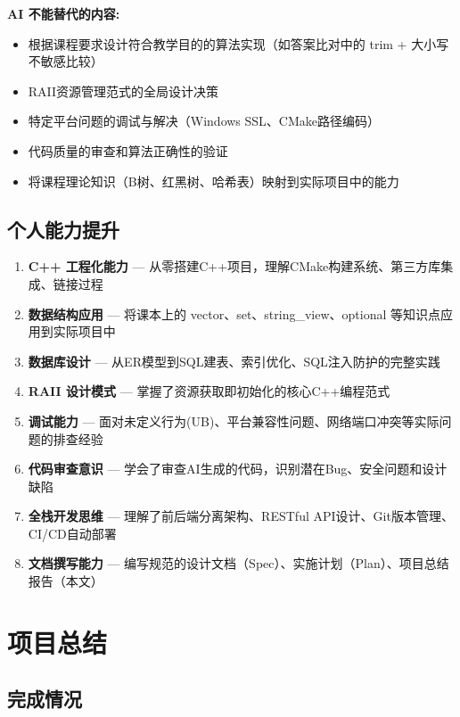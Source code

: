 \documentclass[12pt,a4paper]{ctexart}
\begin{document}
\textbf{AI 不能替代的内容:}
\begin{itemize}[nosep]
    \item 根据课程要求设计符合教学目的的算法实现（如答案比对中的 trim + 大小写不敏感比较）
    \item RAII资源管理范式的全局设计决策
    \item 特定平台问题的调试与解决（Windows SSL、CMake路径编码）
    \item 代码质量的审查和算法正确性的验证
    \item 将课程理论知识（B树、红黑树、哈希表）映射到实际项目中的能力
\end{itemize}

\subsection{个人能力提升}

\begin{enumerate}[nosep]
    \item \textbf{C++ 工程化能力} — 从零搭建C++项目，理解CMake构建系统、第三方库集成、链接过程
    \item \textbf{数据结构应用} — 将课本上的 vector、set、string\_view、optional 等知识点应用到实际项目中
    \item \textbf{数据库设计} — 从ER模型到SQL建表、索引优化、SQL注入防护的完整实践
    \item \textbf{RAII 设计模式} — 掌握了资源获取即初始化的核心C++编程范式
    \item \textbf{调试能力} — 面对未定义行为(UB)、平台兼容性问题、网络端口冲突等实际问题的排查经验
    \item \textbf{代码审查意识} — 学会了审查AI生成的代码，识别潜在Bug、安全问题和设计缺陷
    \item \textbf{全栈开发思维} — 理解了前后端分离架构、RESTful API设计、Git版本管理、CI/CD自动部署
    \item \textbf{文档撰写能力} — 编写规范的设计文档（Spec）、实施计划（Plan）、项目总结报告（本文）
\end{enumerate}

\newpage

\section{项目总结}

\subsection{完成情况}
\end{document}
